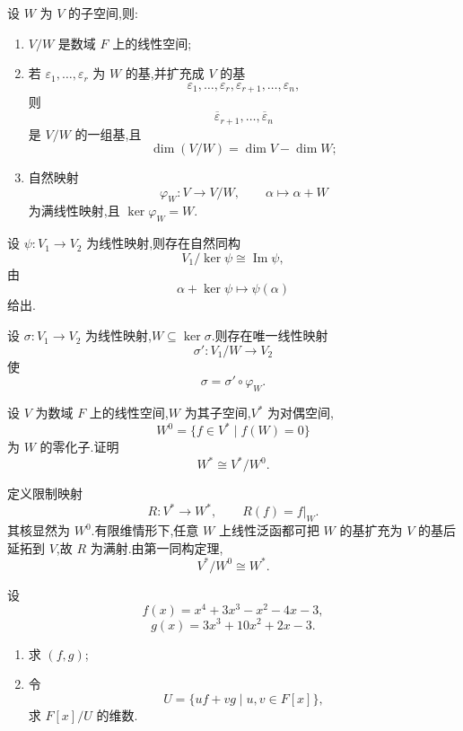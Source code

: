 \begin{theorem}[\markstar]
设 $W$ 为 $V$ 的子空间,则:
\begin{enumerate}
  \item $V/W$ 是数域 $F$ 上的线性空间;
  \item 若 $\varepsilon_1,\ldots,\varepsilon_r$ 为 $W$ 的基,并扩充成 $V$ 的基
  \[
  \varepsilon_1,\ldots,\varepsilon_r,\varepsilon_{r+1},\ldots,\varepsilon_n,
  \]
  则
  \[
  \overline\varepsilon_{r+1},\ldots,\overline\varepsilon_n
  \]
  是 $V/W$ 的一组基,且
  \[
  \dim(V/W)=\dim V-\dim W;
  \]
  \item 自然映射
  \[
  \varphi_W:V\to V/W,
  \qquad
  \alpha\mapsto\alpha+W
  \]
  为满线性映射,且 $\ker\varphi_W=W$.
\end{enumerate}
\end{theorem}

\begin{theorem}
设 $\psi:V_1\to V_2$ 为线性映射,则存在自然同构
\[
V_1/\ker\psi\cong\operatorname{Im}\psi,
\]
由
\[
\alpha+\ker\psi\longmapsto\psi(\alpha)
\]
给出.
\end{theorem}

\begin{theorem}
设 $\sigma:V_1\to V_2$ 为线性映射,$W\subseteq\ker\sigma$.则存在唯一线性映射
\[
\sigma':V_1/W\to V_2
\]
使
\[
\sigma=\sigma'\circ\varphi_W.
\]
\end{theorem}

\begin{example}
设 $V$ 为数域 $F$ 上的线性空间,$W$ 为其子空间,$V^*$ 为对偶空间,
\[
W^0=\{f\in V^*\mid f(W)=0\}
\]
为 $W$ 的零化子.证明
\[
W^*\cong V^*/W^0.
\]
\end{example}
\exampleblank

\begin{solution}
定义限制映射
\[
R:V^*\to W^*,
\qquad
R(f)=f|_W.
\]
其核显然为 $W^0$.有限维情形下,任意 $W$ 上线性泛函都可把 $W$ 的基扩充为 $V$ 的基后延拓到 $V$,故 $R$ 为满射.由第一同构定理,
\[
\boxed{V^*/W^0\cong W^*}.
\]
\end{solution}

\begin{example}
设
\[
f(x)=x^4+3x^3-x^2-4x-3,
\]
\[
g(x)=3x^3+10x^2+2x-3.
\]
\begin{enumerate}
  \item 求 $(f,g)$;
  \item 令
  \[
  U=\{uf+vg\mid u,v\in F[x]\},
  \]
  求 $F[x]/U$ 的维数.
\end{enumerate}
\end{example}
\exampleblank

